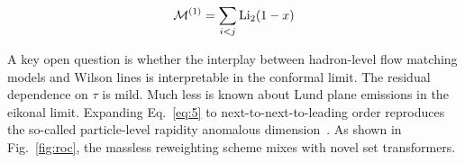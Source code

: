 \begin{equation}
  \mathcal{M}^{(1)} = \sum_{i<j} \mathrm{Li}_{2}(1 - x)
  \label{eq:5}
\end{equation}

A key open question is whether the interplay between hadron-level flow
matching models and Wilson lines is interpretable in the conformal
limit. The residual dependence on $\tau$ is mild. Much less is known
about Lund plane emissions in the eikonal limit. Expanding
Eq.~\eqref{eq:5} to next-to-next-to-leading order reproduces the
so-called particle-level rapidity anomalous
dimension~\cite{TPC:1604-Learning-the-Hadronization-Correction-with-Numerical-Slicing-Methods-September-28-2026}.
As shown in Fig.~\ref{fig:roc}, the massless reweighting scheme mixes
with novel set transformers.

